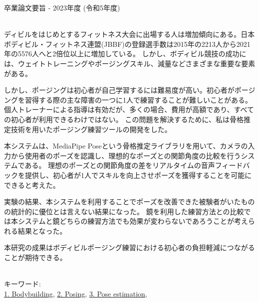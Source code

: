 卒業論文要旨 - 2023年度 (令和5年度)
\begin{center}
\begin{large}
\end{large}
\end{center}

~ \\
  ディビルをはじめとするフィットネス大会に出場する人は増加傾向にある。日本ボディビル・フィットネス連盟(JBBF)の登録選手数は2015年の2213人から2021年の5576人へと2倍位以上に増加している\cite{jbbf}。
  しかし、ボディビル競技の成功には、ウェイトトレーニングやポージングスキル、減量などさまざまな重要な要素がある。

  しかし、ポージングは初心者が自己学習するには難易度が高い。初心者がポージングを習得する際の主な障害の一つに1人で練習することが難しいことがある。
  個人トレーナーによる指導は有効だが、多くの場合、費用が高額であり、すべての初心者が利用できるわけではない。
  この問題を解決するために、私は骨格推定技術を用いたポージング練習ツールの開発をした。

  本システムは、MediaPipe Poseという骨格推定ライブラリを用いて、カメラの入力から使用者のポーズを認識し、理想的なポーズとの関節角度の比較を行うシステムである。
  理想のポーズとの関節角度の差をリアルタイムの音声フィードバックを提供し、初心者が1人でスキルを向上させポーズを獲得することを可能にできると考えた。

  実験の結果、本システムを利用することでポーズを改善できた被験者がいたものの統計的に優位とは言えない結果になった。
  鏡を利用した練習方法との比較では本システムと鏡どちらの練習方法でも効果が変わらないであろうことが考えられる結果となった。

  本研究の成果はボディビルポージング練習における初心者の負担軽減につながることが期待できる。

~ \\
キーワード:\\
\underline{1. Bodybuilding},
\underline{2. Posing},
\underline{3. Pose estimation},
\begin{flushright}
\dept \\
\author
\end{flushright}
